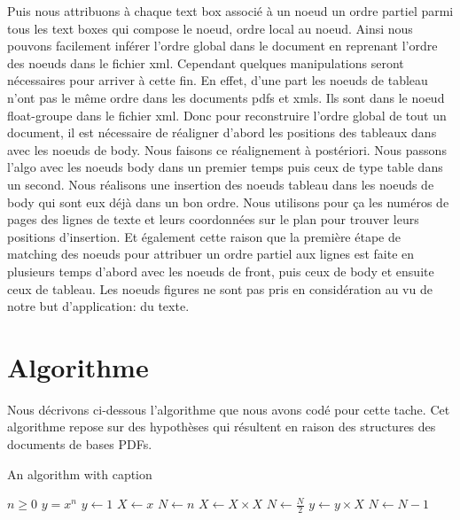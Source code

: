 \documentclass{report}
\begin{document}
\begin{multicols}{2}
    \hspace{.1em} Puis nous attribuons à chaque text box associé à un noeud un ordre partiel parmi tous les text boxes qui compose le noeud, ordre local au noeud. Ainsi nous pouvons facilement inférer l’ordre global dans le document en reprenant l’ordre des noeuds dans le fichier xml. Cependant quelques manipulations seront nécessaires pour arriver à cette fin. En effet, d’une part les noeuds de tableau n’ont pas le même ordre dans les documents pdfs et xmls. Ils sont dans le noeud float-groupe dans le fichier xml. Donc pour reconstruire l’ordre global de tout un document, il est nécessaire de réaligner d’abord les positions des tableaux dans avec les noeuds de body. Nous faisons ce réalignement à postériori. Nous passons l’algo avec les noeuds body dans un premier temps puis ceux de type table dans un second.  Nous réalisons une insertion des noeuds tableau dans les noeuds de body qui sont eux déjà dans un bon ordre. Nous utilisons pour ça les numéros de pages des lignes de texte et leurs coordonnées sur le plan pour trouver leurs positions d’insertion. Et également cette raison que la première étape de matching des noeuds pour attribuer un ordre partiel aux lignes est faite en plusieurs temps d’abord avec les noeuds de front, puis ceux de body et ensuite ceux de tableau. Les noeuds figures ne sont pas pris en considération au vu de notre but d’application: du texte.

    \section{Algorithme}
    Nous décrivons ci-dessous l’algorithme que nous avons codé pour cette tache.
    Cet algorithme repose sur des hypothèses qui résultent en raison des structures des documents de bases PDFs.
    
\begin{algorithm}
    \caption{An algorithm with caption}\label{alg:cap}
    \begin{algorithmic}
    \Require $n \geq 0$
    \Ensure $y = x^n$
    \State $y \gets 1$
    \State $X \gets x$
    \State $N \gets n$
        \State $X \gets X \times X$
        \State $N \gets \frac{N}{2}$  
        \State $y \gets y \times X$
        \State $N \gets N - 1$
    \EndIf
    \EndWhile
    \end{algorithmic}
\end{algorithm}


    
    
\end{multicols}

\hfil
\end{document}
